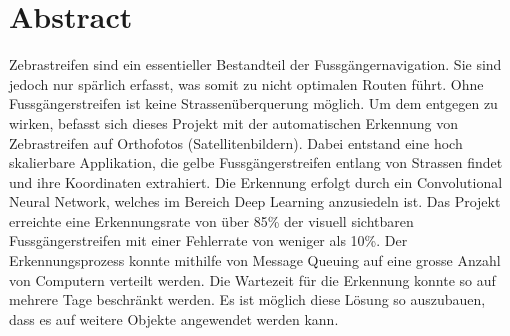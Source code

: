 \chapter*{Abstract}

Zebrastreifen sind ein essentieller Bestandteil der Fussgängernavigation. Sie sind jedoch  nur spärlich erfasst, was somit zu nicht optimalen Routen führt. Ohne Fussgängerstreifen ist keine Strassenüberquerung möglich. 
Um dem entgegen zu wirken,  befasst sich dieses Projekt mit der automatischen Erkennung von Zebrastreifen auf Orthofotos (Satellitenbildern). 
Dabei entstand eine hoch skalierbare Applikation, die gelbe Fussgängerstreifen entlang von Strassen findet und ihre Koordinaten extrahiert. Die Erkennung erfolgt durch ein Convolutional Neural Network, welches im Bereich Deep Learning anzusiedeln ist.
Das Projekt erreichte eine Erkennungsrate von über 85\% der visuell sichtbaren Fussgängerstreifen mit einer Fehlerrate von weniger als 10\%. Der Erkennungsprozess konnte mithilfe von Message Queuing auf eine grosse Anzahl von Computern verteilt werden. Die Wartezeit für die Erkennung konnte so auf mehrere Tage beschränkt werden.
Es ist möglich diese Lösung so auszubauen, dass es auf weitere Objekte angewendet werden kann.
